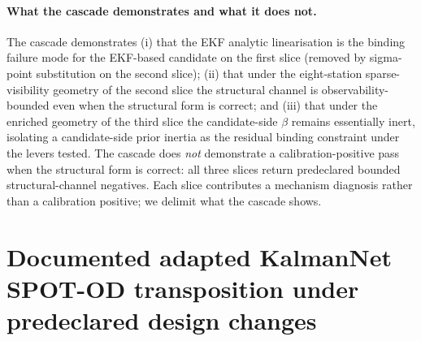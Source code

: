 \documentclass{article}
\begin{document}
\paragraph{What the cascade demonstrates and what it does not.}
The cascade demonstrates (i) that the EKF analytic linearisation is the binding failure mode for the EKF-based candidate on the first slice (removed by sigma-point substitution on the second slice); (ii) that under the eight-station sparse-visibility geometry of the second slice the structural channel is observability-bounded even when the structural form is correct; and (iii) that under the enriched geometry of the third slice the candidate-side $\beta$ remains essentially inert, isolating a candidate-side prior inertia as the residual binding constraint under the levers tested. The cascade does \emph{not} demonstrate a calibration-positive pass when the structural form is correct: all three slices return predeclared bounded structural-channel negatives. Each slice contributes a mechanism diagnosis rather than a calibration positive; we delimit what the cascade shows.

\clearpage
\section{Documented adapted KalmanNet SPOT-OD transposition under predeclared design changes}
\label{app:kalmannet-spot-od-transposition}
\end{document}
